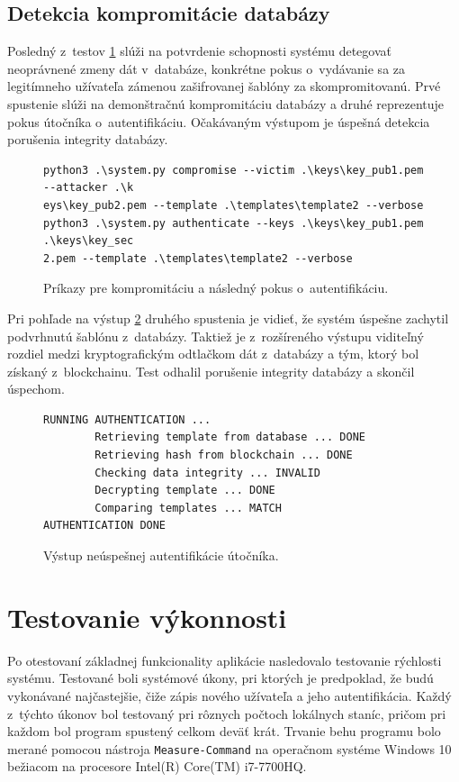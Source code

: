 \subsection{Detekcia kompromitácie databázy}
Posledný z~testov \ref{terminal7} slúži na potvrdenie schopnosti systému detegovať neoprávnené zmeny dát v~databáze, konkrétne pokus o~vydávanie sa za legitímneho užívateľa zámenou zašifrovanej šablóny za skompromitovanú. Prvé spustenie slúži na demonštračnú kompromitáciu databázy a druhé reprezentuje pokus útočníka o~autentifikáciu. Očakávaným výstupom je úspešná detekcia porušenia integrity databázy.

\begin{figure}[hbt]
\renewcommand\figurename{Výpis kódu}
\begin{Verbatim}[frame=single]
python3 .\system.py compromise --victim .\keys\key_pub1.pem --attacker .\k
eys\key_pub2.pem --template .\templates\template2 --verbose
python3 .\system.py authenticate --keys .\keys\key_pub1.pem .\keys\key_sec
2.pem --template .\templates\template2 --verbose
\end{Verbatim}
    \caption{Príkazy pre kompromitáciu a následný pokus o~autentifikáciu.}
	\label{terminal7}
\end{figure}

Pri pohľade na výstup \ref{terminal8} druhého spustenia je vidieť, že systém úspešne zachytil podvrhnutú šablónu z~databázy. Taktiež je z~rozšíreného výstupu viditeľný rozdiel medzi kryptografickým odtlačkom dát z~databázy a tým, ktorý bol získaný z~blockchainu. Test odhalil porušenie integrity databázy a skončil úspechom.
\begin{figure}[hbt]
\renewcommand\figurename{Výpis kódu}
\begin{Verbatim}[frame=single]
RUNNING AUTHENTICATION ...
        Retrieving template from database ... DONE
        Retrieving hash from blockchain ... DONE
        Checking data integrity ... INVALID
        Decrypting template ... DONE
        Comparing templates ... MATCH
AUTHENTICATION DONE
\end{Verbatim}
    \caption{Výstup neúspešnej autentifikácie útočníka.}
	\label{terminal8}
\end{figure}


\section{Testovanie výkonnosti}
Po otestovaní základnej funkcionality aplikácie nasledovalo testovanie rýchlosti systému. Testované boli systémové úkony, pri ktorých je predpoklad, že budú vykonávané najčastejšie, čiže zápis nového užívateľa a jeho autentifikácia. Každý z~týchto úkonov bol testovaný pri rôznych počtoch lokálnych staníc, pričom pri každom bol program spustený celkom deväť krát. Trvanie behu programu bolo merané pomocou nástroja \texttt{Measure-Command} na operačnom systéme Windows 10 bežiacom na procesore Intel(R) Core(TM) i7-7700HQ.


